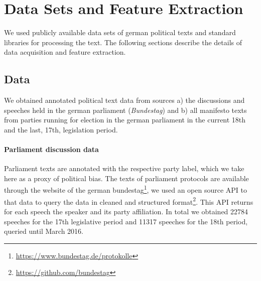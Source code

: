 \documentclass[runningheads,a4paper]{llncs}
\begin{document}
\section{Data Sets and Feature Extraction}\label{sec:data}
%
We used publicly available data sets of german political texts and standard libraries for processing the text. The following sections describe the details of data acquisition and feature extraction. 

\subsection{Data}
We obtained annotated political text data from sources a) the discussions and speeches held in the german parliament ({\em Bundestag}) and b) all manifesto texts from parties running for election in the german parliament in the current 18th and the last, 17th, legislation period.

\paragraph{Parliament discussion data} Parliament texts are annotated with the respective party label, which we take here as a proxy of political bias. The texts of parliament protocols are available through the website of the german bundestag\footnote{\url{https://www.bundestag.de/protokolle}}, we used an open source API to that data to query the data in cleaned and structured format\footnote{\url{https://github.com/bundestag}}. This API returns for each speech the speaker and its party affiliation. In total we obtained 22784 speeches for the 17th legislative period and 11317 speeches for the 18th period, queried until March 2016. 
\end{document}
